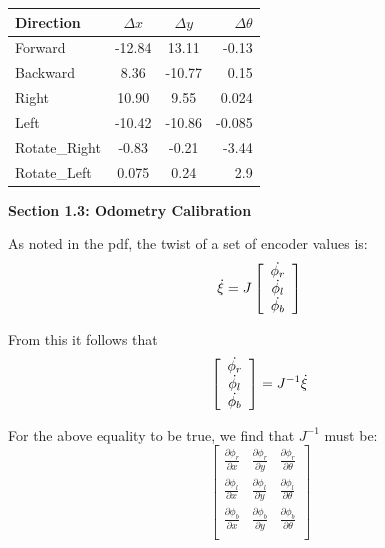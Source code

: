 \documentclass{article}
\begin{document}
\begin{center}
  \begin{tabular}{| l | c | c | r| }
    \hline
    Direction & $\Delta x $ & $\Delta y $ & $\Delta \theta $\\ \hline
    Forward & -12.84 & 13.11 & -0.13 \\ \hline
    Backward & 8.36 & -10.77 & 0.15 \\ \hline
    Right & 10.90 & 9.55 & 0.024 \\ \hline
    Left & -10.42 & -10.86 & -0.085 \\ \hline
    Rotate\_Right & -0.83 & -0.21 & -3.44 \\ \hline
    Rotate\_Left & 0.075 & 0.24 & 2.9 \\
    \hline
  \end{tabular}
\end{center}

\vspace{33mm}
\bf Section 1.3: Odometry Calibration \rm
\vspace{4mm}

As noted in the pdf, the twist of a set of encoder values is:
$$ \dot{\xi} = 
J\left[\begin{array}{c}
\dot{\phi_r} \\
\dot{\phi_l} \\
\dot{\phi_b}
\end{array}\right] \\* 
$$

From this it follows that
$$\left[\begin{array}{c}
\dot{\phi_r} \\
\dot{\phi_l} \\
\dot{\phi_b}
\end{array}\right] = J^{-1}\dot{\xi}
\\* 
$$

For the above equality to be true, we find that $J^{-1}$ must be:
$$
\left[\begin{array}{ccc}
\frac{\partial \phi_r}{\partial x} & \frac{\partial \phi_r}{\partial y} & \frac{\partial \phi_r}{\partial \theta}\\
\frac{\partial \phi_l}{\partial x} & \frac{\partial \phi_l}{\partial y} & \frac{\partial \phi_l}{\partial \theta}\\
\frac{\partial \phi_b}{\partial x} & \frac{\partial \phi_b}{\partial y} & \frac{\partial \phi_b}{\partial \theta}\\
\end{array}\right]
$$
\end{document}

